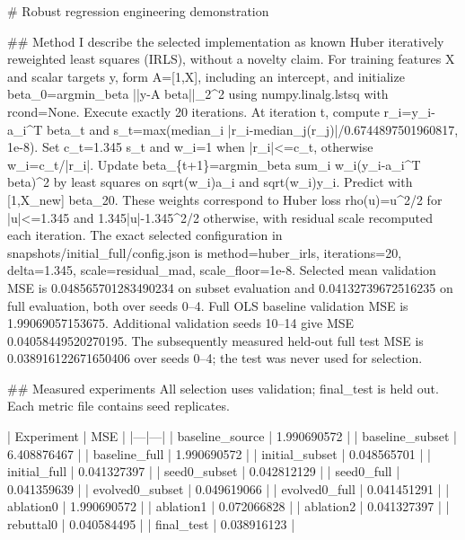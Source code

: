 \documentclass{article}
\begin{document}
\# Robust regression engineering demonstration

\#\# Method
I describe the selected implementation as known Huber iteratively reweighted least squares (IRLS), without a novelty claim. For training features X and scalar targets y, form A=[1,X], including an intercept, and initialize beta\_0=argmin\_beta ||y-A beta||\_2\textasciicircum{}2 using numpy.linalg.lstsq with rcond=None. Execute exactly 20 iterations. At iteration t, compute r\_i=y\_i-a\_i\textasciicircum{}T beta\_t and s\_t=max(median\_i |r\_i-median\_j(r\_j)|/0.6744897501960817, 1e-8). Set c\_t=1.345 s\_t and w\_i=1 when |r\_i|<=c\_t, otherwise w\_i=c\_t/|r\_i|. Update beta\_\{t+1\}=argmin\_beta sum\_i w\_i(y\_i-a\_i\textasciicircum{}T beta)\textasciicircum{}2 by least squares on sqrt(w\_i)a\_i and sqrt(w\_i)y\_i. Predict with [1,X\_new] beta\_20. These weights correspond to Huber loss rho(u)=u\textasciicircum{}2/2 for |u|<=1.345 and 1.345|u|-1.345\textasciicircum{}2/2 otherwise, with residual scale recomputed each iteration. The exact selected configuration in snapshots/initial\_full/config.json is method=huber\_irls, iterations=20, delta=1.345, scale=residual\_mad, scale\_floor=1e-8. Selected mean validation MSE is 0.048565701283490234 on subset evaluation and 0.04132739672516235 on full evaluation, both over seeds 0–4. Full OLS baseline validation MSE is 1.99069057153675. Additional validation seeds 10–14 give MSE 0.04058449520270195. The subsequently measured held-out full test MSE is 0.038916122671650406 over seeds 0–4; the test was never used for selection.

\#\# Measured experiments
All selection uses validation; final\_test is held out. Each metric file contains seed replicates.

| Experiment | MSE |
|---|---|
| baseline\_source | 1.990690572 |
| baseline\_subset | 6.408876467 |
| baseline\_full | 1.990690572 |
| initial\_subset | 0.048565701 |
| initial\_full | 0.041327397 |
| seed0\_subset | 0.042812129 |
| seed0\_full | 0.041359639 |
| evolved0\_subset | 0.049619066 |
| evolved0\_full | 0.041451291 |
| ablation0 | 1.990690572 |
| ablation1 | 0.072066828 |
| ablation2 | 0.041327397 |
| rebuttal0 | 0.040584495 |
| final\_test | 0.038916123 |
\end{document}
